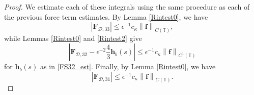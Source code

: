\documentclass[11pt]{article}
\numberwithin{equation}{section}
\newcommand{\T}{\mathbb{T}}
\newcommand{\abs}[1]{\left\lvert #1 \right\rvert}
\newcommand{\norm}[1]{\left\lVert #1 \right\rVert}
\newcommand{\mc}[1]{\mathcal{#1}}
\theoremstyle{definition}
\begin{document}
\begin{proof}
We estimate each of these integrals using the same procedure as each of the previous force term estimates. By Lemma \ref{Rintest0}, we have
\begin{equation}\label{FD33_est}
\abs{\bm{F}_{\mc{D},33}} \le \epsilon^{-1}c_\kappa\norm{\bm{f}}_{C(\T)},
\end{equation}
while Lemmas \ref{Rintest0} and \ref{Rintest2} give
\begin{equation}\label{FD32_est}
\abs{\bm{F}_{\mc{D},32} - \epsilon^{-2}\frac{4}{3}\bm{h}_b(s)} \le \epsilon^{-1}c_\kappa \norm{\bm{f}}_{C^1(\T)}
\end{equation}
for $\bm{h}_b(s)$ as in \eqref{FS32_est}. Finally, by Lemma \ref{Rintest0}, we have
\begin{equation}\label{FD31_est}
\abs{\bm{F}_{\mc{D},31}} \le \epsilon^{-1} c_\kappa \norm{\bm{f}}_{C(\T)}.
\end{equation}


\end{proof}
\end{document}

